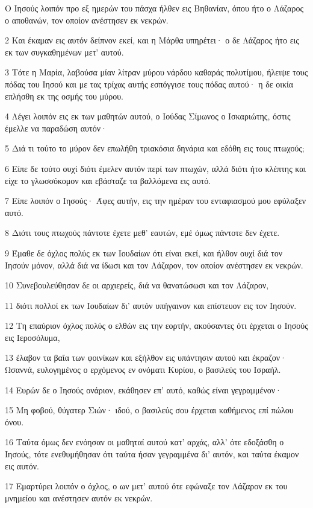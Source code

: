 \par Ο Ιησούς λοιπόν προ εξ ημερών του πάσχα ήλθεν εις Βηθανίαν, όπου ήτο ο Λάζαρος ο αποθανών, τον οποίον ανέστησεν εκ νεκρών.
\par 2 Και έκαμαν εις αυτόν δείπνον εκεί, και η Μάρθα υπηρέτει· ο δε Λάζαρος ήτο εις εκ των συγκαθημένων μετ' αυτού.
\par 3 Τότε η Μαρία, λαβούσα μίαν λίτραν μύρου νάρδου καθαράς πολυτίμου, ήλειψε τους πόδας του Ιησού και με τας τρίχας αυτής εσπόγγισε τους πόδας αυτού· η δε οικία επλήσθη εκ της οσμής του μύρου.
\par 4 Λέγει λοιπόν εις εκ των μαθητών αυτού, ο Ιούδας Σίμωνος ο Ισκαριώτης, όστις έμελλε να παραδώση αυτόν·
\par 5 Διά τι τούτο το μύρον δεν επωλήθη τριακόσια δηνάρια και εδόθη εις τους πτωχούς;
\par 6 Είπε δε τούτο ουχί διότι έμελεν αυτόν περί των πτωχών, αλλά διότι ήτο κλέπτης και είχε το γλωσσόκομον και εβάσταζε τα βαλλόμενα εις αυτό.
\par 7 Είπε λοιπόν ο Ιησούς· Άφες αυτήν, εις την ημέραν του ενταφιασμού μου εφύλαξεν αυτό.
\par 8 Διότι τους πτωχούς πάντοτε έχετε μεθ' εαυτών, εμέ όμως πάντοτε δεν έχετε.
\par 9 Έμαθε δε όχλος πολύς εκ των Ιουδαίων ότι είναι εκεί, και ήλθον ουχί διά τον Ιησούν μόνον, αλλά διά να ίδωσι και τον Λάζαρον, τον οποίον ανέστησεν εκ νεκρών.
\par 10 Συνεβουλεύθησαν δε οι αρχιερείς, διά να θανατώσωσι και τον Λάζαρον,
\par 11 διότι πολλοί εκ των Ιουδαίων δι' αυτόν υπήγαινον και επίστευον εις τον Ιησούν.
\par 12 Τη επαύριον όχλος πολύς ο ελθών εις την εορτήν, ακούσαντες ότι έρχεται ο Ιησούς εις Ιεροσόλυμα,
\par 13 έλαβον τα βαΐα των φοινίκων και εξήλθον εις υπάντησιν αυτού και έκραζον· Ωσαννά, ευλογημένος ο ερχόμενος εν ονόματι Κυρίου, ο βασιλεύς του Ισραήλ.
\par 14 Ευρών δε ο Ιησούς ονάριον, εκάθησεν επ' αυτό, καθώς είναι γεγραμμένον·
\par 15 Μη φοβού, θύγατερ Σιών· ιδού, ο βασιλεύς σου έρχεται καθήμενος επί πώλου όνου.
\par 16 Ταύτα όμως δεν ενόησαν οι μαθηταί αυτού κατ' αρχάς, αλλ' ότε εδοξάσθη ο Ιησούς, τότε ενεθυμήθησαν ότι ταύτα ήσαν γεγραμμένα δι' αυτόν, και ταύτα έκαμον εις αυτόν.
\par 17 Εμαρτύρει λοιπόν ο όχλος, ο ων μετ' αυτού ότε εφώναξε τον Λάζαρον εκ του μνημείου και ανέστησεν αυτόν εκ νεκρών.
